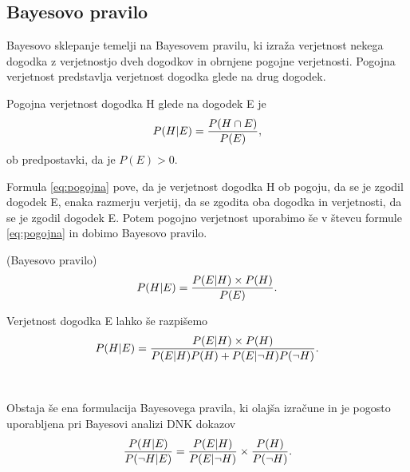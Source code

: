 \documentclass[fin1, tisk]{fmfdelo}
\theoremstyle{definition}
\theoremstyle{trditev}
\theoremstyle{izrek}
\begin{document}
\subsection{Bayesovo pravilo}
Bayesovo sklepanje temelji na Bayesovem pravilu, ki izraža verjetnost nekega dogodka z verjetnostjo dveh dogodkov in obrnjene pogojne
verjetnosti. Pogojna verjetnost predstavlja verjetnost dogodka glede na drug dogodek.
\begin{definicija}
   Pogojna verjetnost dogodka H glede na dogodek E je
   \begin{equation}\label{eq:pogojna}
        P(H \lvert E) = \frac{P(H \cap E)}{P(E)}, \vspace{2mm}
   \end{equation}
   ob predpostavki, da je $P(E) > 0$.
\end{definicija}
Formula \eqref{eq:pogojna} pove, da je verjetnost dogodka H ob pogoju, da se je zgodil dogodek E, enaka razmerju verjetij, da se
zgodita oba dogodka in verjetnosti, da se je zgodil dogodek E.
Potem pogojno verjetnost uporabimo še v števcu formule \eqref{eq:pogojna} in dobimo Bayesovo pravilo.
\begin{izrek}
    (Bayesovo pravilo)
    \begin{equation}\label{eq:bpravilo}
        P(H \lvert E) = \frac{P(E \lvert H) \times P(H)}{P(E)}. \vspace{2mm}
     \end{equation}
\end{izrek}
Verjetnost dogodka E lahko še razpišemo
\begin{equation}\label{eq:b_pravilo}
   P(H \lvert E) = \frac{P(E \lvert H) \times P(H)}{P(E \lvert H)P(H) + P(E \lvert \neg H)P(\neg H)}. \vspace{2mm}
\end{equation} \\\\
Obstaja še ena formulacija Bayesovega pravila, ki olajša izračune in je pogosto uporabljena pri Bayesovi analizi DNK dokazov
\begin{equation}\label{eq:b_pravilo_DNK}
   \frac{P(H \lvert E)}{P(\neg H \lvert E)} = \frac{P(E \lvert H)}{P(E \lvert \neg H)} \times \frac{P(H)}{P(\neg H)}. \vspace{2mm}
\end{equation}

\end{document}
